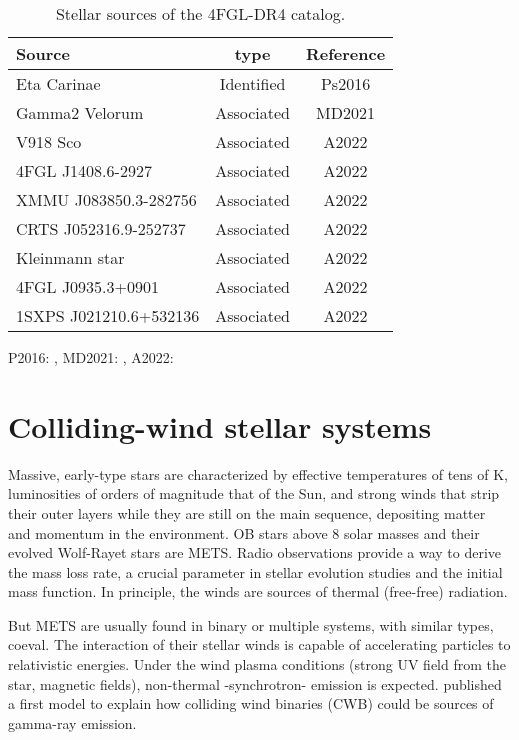\documentclass[baaa]{baaa}
\begin{document}
\begin{table}[!h]
\centering
\caption{Stellar sources of the 4FGL-DR4 catalog.}
\begin{tabular}{l c c}
\hline\hline\noalign{\smallskip}
Source & type  &  Reference\\
\hline\noalign{\smallskip}
Eta Carinae    & Identified & Ps2016 \\
Gamma2 Velorum & Associated & MD2021\\
V918 Sco       &  Associated & A2022 \\
4FGL J1408.6-2927& Associated & A2022 \\
XMMU J083850.3-282756 & Associated & A2022\\
CRTS J052316.9-252737&  Associated & A2022\\
Kleinmann star& Associated & A2022\\
4FGL J0935.3+0901&  Associated & A2022\\
1SXPS J021210.6+532136& Associated & A2022\\
\hline
\end{tabular}
P2016: \citet{pshirkov2016}, MD2021: \citet{martidevesa2021}, A2022: \citet{abdollahi2022}
\label{tabla1}
\end{table}

 
\section{Colliding-wind stellar systems}
\label{sect:cwb}

Massive, early-type stars are characterized by effective temperatures of tens of K, luminosities of orders of magnitude that of the Sun, and strong winds that strip their outer layers while they are still on the main sequence, depositing matter and momentum in the environment. OB stars above 8 solar masses and their evolved Wolf-Rayet stars are METS.
Radio observations provide a way to derive the mass loss rate, a crucial parameter in stellar evolution studies and the initial mass function. In principle, the winds are sources of thermal (free-free) radiation. 

But METS are usually found in binary or multiple systems, with similar types, coeval. The interaction of their stellar winds is capable of accelerating particles to relativistic energies. Under the wind plasma conditions (strong UV field from the star, magnetic fields), non-thermal -synchrotron- emission is expected. \citet{eichler1993} published a first model to explain how colliding wind binaries (CWB) could be sources of gamma-ray emission.
\end{document}
